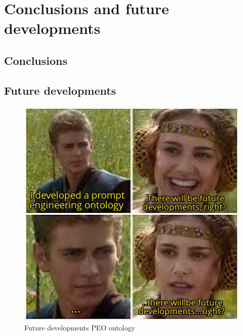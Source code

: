 \chapter{Conclusions and future developments}

\section{Conclusions}

\section{Future developments}

\begin{figure}[H]
    \centering
    \includegraphics[width=0.65\linewidth]{Figures/fig_81.jpg}
    \caption{Future developments PEO ontology}
    \label{fig:enter-label}
\end{figure}